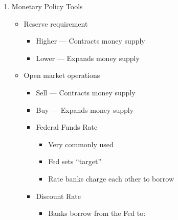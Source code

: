 \documentclass[12pt]{article}
\begin{document}
\begin{enumerate}
\begin{itemize}
\begin{center}
        \end{center}

    \end{itemize}

  \item Monetary Policy Tools

    \begin{itemize}

      \item Reserve requirement

        \begin{itemize}

          \item Higher — Contracts money supply

          \item Lower — Expands money supply

        \end{itemize}

      \item Open market operations

        \begin{itemize}

          \item Sell — Contracts money supply

          \item Buy — Expands money supply

          \item Federal Funds Rate

            \begin{itemize}

              \item Very commonly used

              \item Fed sets “target”

              \item Rate banks charge each other to borrow

            \end{itemize}

          \item Discount Rate

            \begin{itemize}

              \item Banks borrow from the Fed to:

                \begin{itemize}


\end{itemize}
\end{itemize}
\end{itemize}
\end{itemize}
\end{enumerate}
\end{document}
